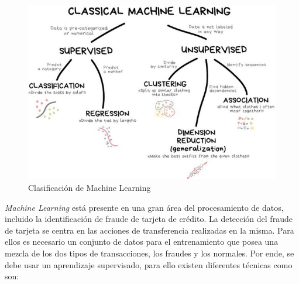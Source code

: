 \begin{figure}
	\centering
	\includegraphics[width=1.1\textwidth]{"figuras/Fig1"}
	\caption{Clasificaci\'{o}n de Machine Learning}
\end{figure}

  \textit{Machine Learning} est\'{a} presente en una gran \'{a}rea del procesamiento de datos, incluido la identificaci\'{o}n de fraude de tarjeta de cr\'{e}dito. La detecci\'{o}n del fraude de tarjeta se centra en las acciones de transferencia realizadas en la misma. Para ellos es necesario un conjunto de datos para el entrenamiento que posea una mezcla de los dos tipos de transacciones, los fraudes y los normales. Por ende, se debe usar un aprendizaje supervisado, para ello existen diferentes t\'{e}cnicas como son\cite{4}:
  
